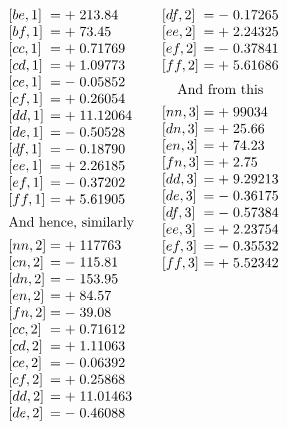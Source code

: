 {\[\begin{array}{@{}l@{\qquad}l@{\qquad}l@{}}
\begin{array}[t]{@{}l@{\;}c@{\;}c@{\;}l@{}}
{[be,1]}&=&+&213.84\\
{[bf,1]}&=&+&73.45\\
{[cc,1]}&=&+&0.71769\\
{[cd,1]}&=&+&1.09773\\
{[ce,1]}&=&-&0.05852\\
{[cf,1]}&=&+&0.26054\\
{[dd,1]}&=&+&11.12064\\
{[de,1]}&=&-&0.50528\\
{[df,1]}&=&-&0.18790\\
{[ee,1]}&=&+&2.26185\\
{[ef,1]}&=&-&0.37202\\
{[ff,1]}&=&+&5.61905\\[4.5pt]
\multicolumn{4}{@{}c@{}}{\text{And hence, similarly}}\\[4.5pt]
{[nn,2]}&=&+&117763\\
{[cn,2]}&=&-&115.81\\
{[dn,2]}&=&-&153.95\\
{[en,2]}&=&+&84.57\\
{[fn,2]}&=&-&39.08\\
{[cc,2]}&=&+&0.71612\\
{[cd,2]}&=&+&1.11063\\
{[ce,2]}&=&-&0.06392\\
{[cf,2]}&=&+&0.25868\\
{[dd,2]}&=&+&11.01463\\
{[de,2]}&=&-&0.46088
\end{array}&
\begin{array}[t]{@{}l@{\;}c@{\;}c@{\;}l@{}}
{[df,2]}&=&-&0.17265\\
{[ee,2]}&=&+&2.24325\\
{[ef,2]}&=&-&0.37841\\
{[ff,2]}&=&+&5.61686\\[5.5pt]
\multicolumn{4}{@{}c@{}}{\text{And from this}}\\[4pt]
{[nn,3]}&=&+&99034\\
{[dn,3]}&=&+&25.66\\
{[en,3]}&=&+&74.23\\
{[fn,3]}&=&+&2.75\\
{[dd,3]}&=&+&9.29213\\
{[de,3]}&=&-&0.36175\\
{[df,3]}&=&-&0.57384\\
{[ee,3]}&=&+&2.23754\\
{[ef,3]}&=&-&0.35532\\
{[ff,3]}&=&+&5.52342\\[5.5pt]

\end{array}
\end{array}\]}

